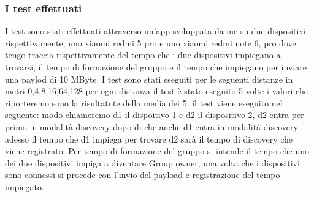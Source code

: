 \subsubsection{I test effettuati}
I test sono stati effettuati attraverso un'app sviluppata da me
su due dispositivi rispettivamente,
uno xiaomi redmi 5 pro e uno xiaomi redmi note 6, pro dove tengo
traccia rispettivamente del tempo che i due dispositivi impiegano a 
trovarsi, il tempo di formazione del gruppo e il tempo che impiegano
per inviare una paylod di 10 MByte.
I test sono stati eseguiti per le seguenti distanze in metri 0,4,8,16,64,128
per ogni distanza il test è stato eseguito 5 volte 
i valori che riporteremo sono la risultatnte della media dei 5.
il test viene eseguito nel seguente: modo chiameremo d1 il dispoitivo 1
e d2 il dispositivo 2,
d2 entra per primo in modalità discovery dopo di che anche d1 entra in modalità
discovery adesso il tempo che d1 impiega per trovare d2 sarà il tempo 
di discovery che viene registrato. Per tempo di formazione del 
gruppo si intende il tempo che uno dei due dispositivi impiga a
diventare Group owner, una volta che i dispositivi sono connessi
si procede con l'invio del payload e registrazione del tempo impiegato.

